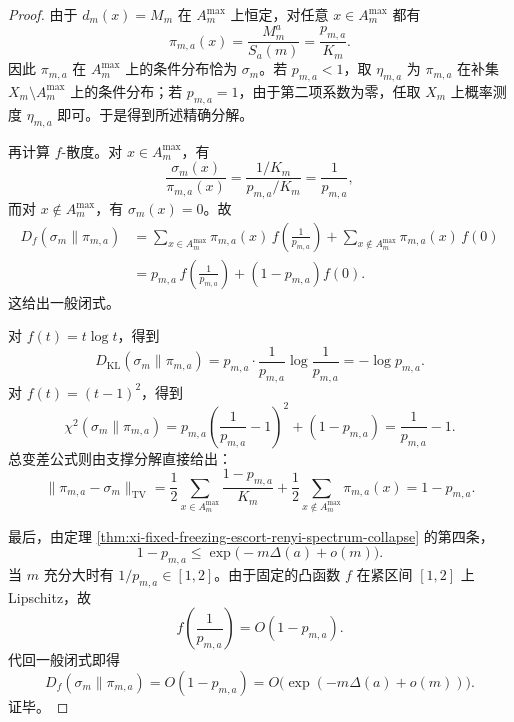 \begin{proof}
由于 \(d_m(x)=M_m\) 在 \(A_m^{\max}\) 上恒定，对任意 \(x\in A_m^{\max}\) 都有
\[
\pi_{m,a}(x)=\frac{M_m^a}{S_a(m)}=\frac{p_{m,a}}{K_m}.
\]
因此 \(\pi_{m,a}\) 在 \(A_m^{\max}\) 上的条件分布恰为 \(\sigma_m\)。若 \(p_{m,a}<1\)，取 \(\eta_{m,a}\) 为 \(\pi_{m,a}\) 在补集 \(X_m\setminus A_m^{\max}\) 上的条件分布；若 \(p_{m,a}=1\)，由于第二项系数为零，任取 \(X_m\) 上概率测度 \(\eta_{m,a}\) 即可。于是得到所述精确分解。

再计算 \(f\)-散度。对 \(x\in A_m^{\max}\)，有
\[
\frac{\sigma_m(x)}{\pi_{m,a}(x)}
=
\frac{1/K_m}{p_{m,a}/K_m}
=
\frac{1}{p_{m,a}},
\]
而对 \(x\notin A_m^{\max}\)，有 \(\sigma_m(x)=0\)。故
\[
\begin{aligned}
D_f(\sigma_m\|\pi_{m,a})
&=
\sum_{x\in A_m^{\max}}\pi_{m,a}(x)\,
f\!\left(\frac{1}{p_{m,a}}\right)
+
\sum_{x\notin A_m^{\max}}\pi_{m,a}(x)\,f(0)\\
&=
p_{m,a}\,f\!\left(\frac{1}{p_{m,a}}\right)
+(1-p_{m,a})f(0).
\end{aligned}
\]
这给出一般闭式。

对 \(f(t)=t\log t\)，得到
\[
D_{\mathrm{KL}}(\sigma_m\|\pi_{m,a})
=
p_{m,a}\cdot \frac{1}{p_{m,a}}\log\frac{1}{p_{m,a}}
=
-\log p_{m,a}.
\]
对 \(f(t)=(t-1)^2\)，得到
\[
\chi^2(\sigma_m\|\pi_{m,a})
=
p_{m,a}\left(\frac{1}{p_{m,a}}-1\right)^2+(1-p_{m,a})
=
\frac{1}{p_{m,a}}-1.
\]
总变差公式则由支撑分解直接给出：
\[
\|\pi_{m,a}-\sigma_m\|_{\mathrm{TV}}
=
\frac12\sum_{x\in A_m^{\max}}\frac{1-p_{m,a}}{K_m}
+\frac12\sum_{x\notin A_m^{\max}}\pi_{m,a}(x)
=
1-p_{m,a}.
\]

最后，由定理 \ref{thm:xi-fixed-freezing-escort-renyi-spectrum-collapse} 的第四条，
\[
1-p_{m,a}\le \exp\!\bigl(-m\Delta(a)+o(m)\bigr).
\]
当 \(m\) 充分大时有 \(1/p_{m,a}\in[1,2]\)。由于固定的凸函数 \(f\) 在紧区间 \([1,2]\) 上 Lipschitz，故
\[
f\!\left(\frac{1}{p_{m,a}}\right)=O(1-p_{m,a}).
\]
代回一般闭式即得
\[
D_f(\sigma_m\|\pi_{m,a})
=
O(1-p_{m,a})
=
O\!\bigl(\exp(-m\Delta(a)+o(m))\bigr).
\]
证毕。
\end{proof}

